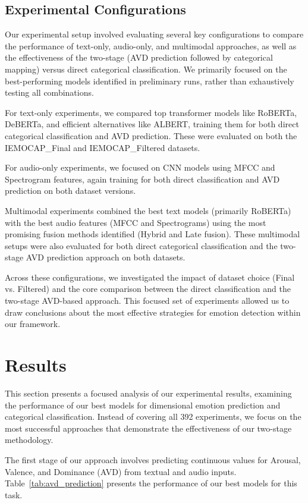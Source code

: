 \documentclass[12pt]{article}
\begin{document}
\subsection{Experimental Configurations}
Our experimental setup involved evaluating several key configurations to compare the performance of text-only, audio-only, and multimodal approaches, as well as the effectiveness of the two-stage (AVD prediction followed by categorical mapping) versus direct categorical classification. We primarily focused on the best-performing models identified in preliminary runs, rather than exhaustively testing all combinations.

For text-only experiments, we compared top transformer models like RoBERTa, DeBERTa, and efficient alternatives like ALBERT, training them for both direct categorical classification and AVD prediction. These were evaluated on both the IEMOCAP\_Final and IEMOCAP\_Filtered datasets.

For audio-only experiments, we focused on CNN models using MFCC and Spectrogram features, again training for both direct classification and AVD prediction on both dataset versions.

Multimodal experiments combined the best text models (primarily RoBERTa) with the best audio features (MFCC and Spectrograms) using the most promising fusion methods identified (Hybrid and Late fusion). These multimodal setups were also evaluated for both direct categorical classification and the two-stage AVD prediction approach on both datasets.

Across these configurations, we investigated the impact of dataset choice (Final vs. Filtered) and the core comparison between the direct classification and the two-stage AVD-based approach. This focused set of experiments allowed us to draw conclusions about the most effective strategies for emotion detection within our framework.\section{Results}
\label{sec:results}

This section presents a focused analysis of our experimental results, examining the performance of our best models for dimensional emotion prediction and categorical classification. Instead of covering all 392 experiments, we focus on the most successful approaches that demonstrate the effectiveness of our two-stage methodology.

The first stage of our approach involves predicting continuous values for Arousal, Valence, and Dominance (AVD) from textual and audio inputs. Table~\ref{tab:avd_prediction} presents the performance of our best models for this task.
\end{document}
